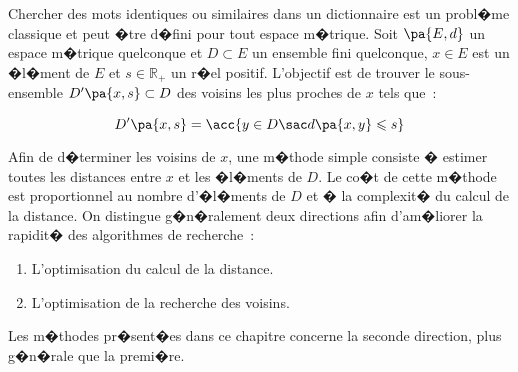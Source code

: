 %
\firstpassagedo{}
%
\firstpassagedo{}



\newcommand{\initialisation}[0]{initialisation : \\}
\newcommand{\step}[0]{body : \newline}
\newcommand{\terminaison}[0]{termination : \\}
\newcommand{\for}[2]{for $#1$ to $#2$ do}
\newcommand{\forend}[0]{end for \\}
\newcommand{\while}[1]{while $\pa { #1 }$ do\\}
\newcommand{\whilenotl}[1]{while $\pa { #1 }$ do}
\newcommand{\whileend}[0]{end while}

\newenvironment{algopar}{}{}
\newcommand{\ind}[0]{\null \quad}

\label{space_metric_introduction}


\sloppy


Chercher des mots identiques ou similaires dans un dictionnaire est un probl�me classique et peut �tre d�fini pour tout espace m�trique.  Soit $\pa{E,d}$ un espace m�trique quelconque et $D \subset E$ un ensemble fini quelconque, $x \in E$ est un �l�ment de $E$ et $s \in \mathbb{R}_+$ un r�el positif. L'objectif est de trouver le sous-ensemble $D'\pa{x,s} \subset D$ des voisins les plus proches de $x$ tels que~:

    $$
    D'\pa{x,s} = \acc{  y \in D \sac d\pa{x,y} \leqslant s}
    $$

Afin de d�terminer les voisins de $x$, une m�thode simple consiste � estimer toutes les distances entre $x$ et les �l�ments de $D$. Le co�t de cette m�thode est proportionnel au nombre d'�l�ments de $D$ et � la complexit� du calcul de la distance. On distingue g�n�ralement deux directions afin d'am�liorer la rapidit� des algorithmes de recherche~:

    \begin{enumerate}
    \item L'optimisation du calcul de la distance.
    \item L'optimisation de la recherche des voisins.
    \end{enumerate}


Les m�thodes pr�sent�es dans ce chapitre concerne la seconde direction, plus g�n�rale que la premi�re.









